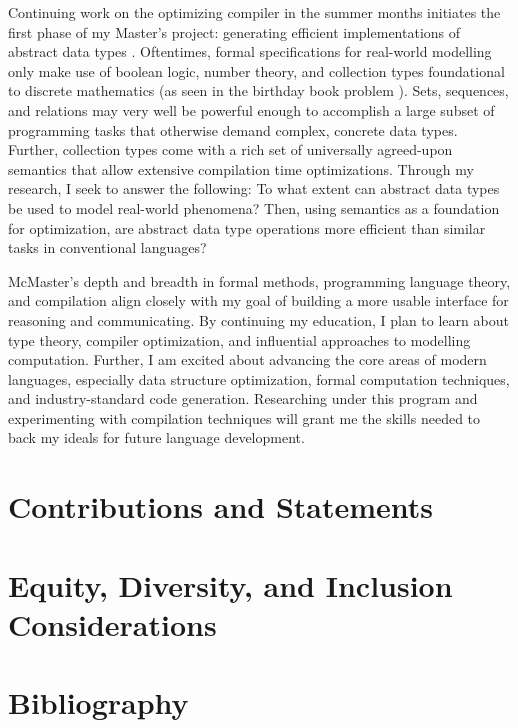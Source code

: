\documentclass[12pt]{article}
\begin{document}
Continuing work on the optimizing compiler in the summer months initiates the first phase of my Master's project: generating efficient implementations of abstract data types \cite{hunt2025generating}. Oftentimes, formal specifications for real-world modelling only make use of boolean logic, number theory, and collection types foundational to discrete mathematics (as seen in the birthday book problem \cite{spivey1989birthday}). Sets, sequences, and relations may very well be powerful enough to accomplish a large subset of programming tasks that otherwise demand complex, concrete data types. Further, collection types come with a rich set of universally agreed-upon semantics \cite{griesAndSchneider} that allow extensive compilation time optimizations. Through my research, I seek to answer the following: To what extent can abstract data types be used to model real-world phenomena? Then, using semantics as a foundation for optimization, are abstract data type operations more efficient than similar tasks in conventional languages?

McMaster's depth and breadth in formal methods, programming language theory, and compilation align closely with my goal of building a more usable interface for reasoning and communicating. By continuing my education, I plan to learn about type theory, compiler optimization, and influential approaches to modelling computation. Further, I am excited about advancing the core areas of modern languages, especially data structure optimization, formal computation techniques, and industry-standard code generation. Researching under this program and experimenting with compilation techniques will grant me the skills needed to back my ideals for future language development.


\section{Contributions and Statements}
\section{Equity, Diversity, and Inclusion Considerations}

\section{Bibliography}
\printbibliography %
\end{document}
